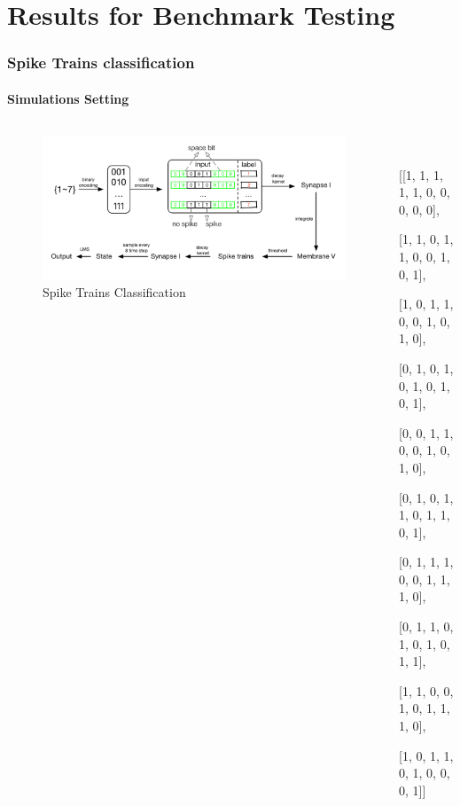 \documentclass[10pt,aspectratio=43,mathserif, notes]{beamer}
\begin{document}
\section[Results]{Results for Benchmark Testing}
		\begin{frame}
		  \frametitle{\textbf{Spike Trains classification}}
		  \framesubtitle{Simulations Setting}
            \begin{columns}
            \begin{column}{0.5\textwidth}
            \begin{figure}[h]
            \centering
            \includegraphics[width=0.9\linewidth]{image/sim2.pdf}
            \caption{Spike Trains Classification}
            \label{ST_Task}
            \end{figure}
            \end{column}
            \begin{column}{0.5\textwidth}
            \\
                \small { [[1, 1, 1, 1, 1, 0, 0, 0, 0, 0],

                         [1, 1, 0, 1, 1, 0, 0, 1, 0, 1],

                         [1, 0, 1, 1, 0, 0, 1, 0, 1, 0],

                         [0, 1, 0, 1, 0, 1, 0, 1, 0, 1],

                         [0, 0, 1, 1, 0, 0, 1, 0, 1, 0],

                         [0, 1, 0, 1, 1, 0, 1, 1, 0, 1],

                         [0, 1, 1, 1, 0, 0, 1, 1, 1, 0],

                         [0, 1, 1, 0, 1, 0, 1, 0, 1, 1],

                         [1, 1, 0, 0, 1, 0, 1, 1, 1, 0],

                         [1, 0, 1, 1, 0, 1, 0, 0, 0, 1]]}
            \end{column}
            \end{columns}
		\end{frame}
\end{document}
